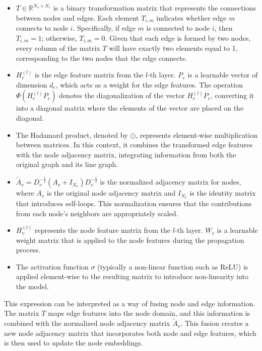 \begin{itemize}
    \item \( T \in \mathbb{R}^{N_v \times N_e} \) is a binary transformation matrix that represents the connections between nodes and edges. Each element \( T_{i,m} \) indicates whether edge \( m \) connects to node \( i \). Specifically, if edge \( m \) is connected to node \( i \), then \( T_{i,m} = 1 \); otherwise, \( T_{i,m} = 0 \). Given that each edge is formed by two nodes, every column of the matrix \( T \) will have exactly two elements equal to 1, corresponding to the two nodes that the edge connects. 
    \item \( H^{(l)}_e \) is the edge feature matrix from the \( l \)-th layer. \( P_e \) is a learnable vector of dimension \( d_e \), which acts as a weight for the edge features. The operation \( \Phi(H^{(l)}_e P_e) \) denotes the diagonalization of the vector \( H^{(l)}_e P_e \), converting it into a diagonal matrix where the elements of the vector are placed on the diagonal. 
    \item The Hadamard product, denoted by \( \odot \), represents element-wise multiplication between matrices. In this context, it combines the transformed edge features with the node adjacency matrix, integrating information from both the original graph and its line graph.
    \item \( \tilde{A}_v = D_v^{-\frac{1}{2}} (A_v + I_{N_v}) D_v^{-\frac{1}{2}} \) is the normalized adjacency matrix for nodes, where \( A_v \) is the original node adjacency matrix and \( I_{N_v} \) is the identity matrix that introduces self-loops. This normalization ensures that the contributions from each node's neighbors are appropriately scaled. 
    \item \( H^{(l)}_v \) represents the node feature matrix from the \( l \)-th layer. \( W_v \) is a learnable weight matrix that is applied to the node features during the propagation process. 
    \item The activation function \( \sigma \) (typically a non-linear function such as ReLU) is applied element-wise to the resulting matrix to introduce non-linearity into the model.

\end{itemize}


This expression can be interpreted as a way of fusing node and edge information. The matrix \( T \) maps edge features into the node domain, and this information is combined with the normalized node adjacency matrix \( \tilde{A}_v \). This fusion creates a new node adjacency matrix that incorporates both node and edge features, which is then used to update the node embeddings.

